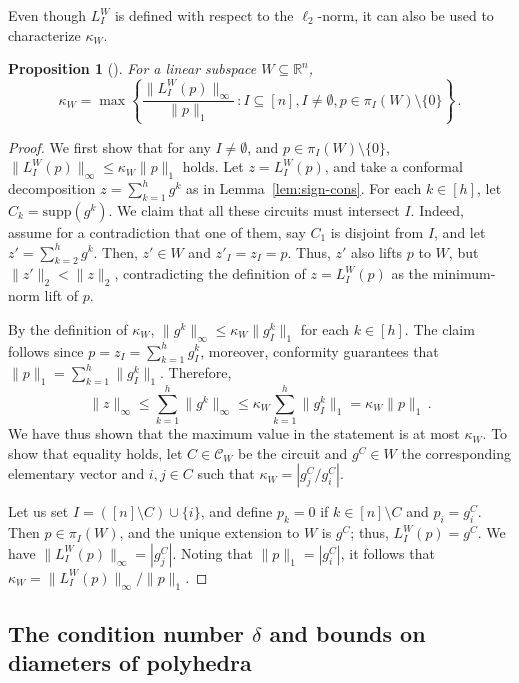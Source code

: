 \documentclass[11pt, a4paper]{article}
\newcommand{\circuits}{\mathcal{C}}
\newcommand{\supp}{\mathrm{supp}}
\newcommand{\1}{\mathbbm{1}}
\newtheorem{prop}[theorem]{Proposition}
\theoremstyle{case}
\newcommand{\R}{\mathbb{R}}
\begin{document}
Even though $L_I^W$ is defined with respect to the $\ell_2$-norm, it can also be used to characterize $\kappa_W$.
\begin{prop}[\cite{DadushNV20}]\label{lem:kappa-lift}
For a linear subspace $W  \subseteq \R^n$,
\[
\kappa_W =\max\left\{ \frac{\|L_I^W(p)\|_\infty}{\|p\|_1}\, : {I\subseteq [n]}, I\neq\emptyset, p\in \pi_I(W)\setminus\{0\}\right\}\, .
\]
\end{prop}

\begin{proof}
We first show that for any $I\neq\emptyset$, and $p\in \pi_I(W)\setminus\{0\}$, $\|L_I^W(p)\|_\infty\le \kappa_W \|p\|_1$ holds. 
Let $z=L_I^W(p)$, and take a conformal decomposition $z=\sum_{k=1}^h g^k$ as in Lemma~\ref{lem:sign-cons}. For each $k\in [h]$, let $C_k=\supp(g^k)$. We claim that all these circuits must intersect $I$. Indeed, assume for a contradiction that one of them, say $C_1$ is disjoint from $I$, and let $z'=\sum_{k=2}^h g^k$. Then, $z'\in W$ and $z'_I=z_I=p$. Thus, $z'$ also lifts $p$ to $W$, but $\|z'\|_2<\|z\|_2$, contradicting the definition of $z=L_I^W(p)$ as the minimum-norm lift of $p$.

By the definition of $\kappa_W$, $\|g^k\|_\infty\le \kappa_W \|g^k_I\|_1$ for each $k\in [h]$. The claim follows since $p=z_I=\sum_{k=1}^h g^k_I$, moreover, conformity guarantees that $\|p\|_1=\sum_{k=1}^h \|g^k_I\|_1$. Therefore,
\[
\|z\|_\infty\le \sum_{k=1}^h \|g^k\|_\infty\le \kappa_W \sum_{k=1}^h \|g^k_I\|_1=\kappa_W\|p\|_1\, .\]
We have thus shown that the maximum value in the statement is at most $\kappa_W$. To show that equality holds, let $C\in\circuits_W$ be the circuit and $g^C\in W$ the corresponding elementary vector and $i,j\in C$ such that $\kappa_W=|g^C_j/g^C_i|$.

Let us set $I=([n]\setminus C)\cup \{i\}$, and define $p_k=0$ if $k\in [n]\setminus C$ and $p_i=g^C_i$. Then  $p\in \pi_I(W)$,  and the unique extension to $W$ is $g^C$; thus, $L_I^W(p)=g^C$. We have $\|L_I^W(p)\|_\infty=|g^C_j|$. Noting that $\|p\|_1=|g^C_i|$, it follows that 
$\kappa_W=\|L_I^W(p)\|_\infty/\|p\|_1$.
\end{proof}

\subsection{The condition number $\delta$ and bounds on diameters of polyhedra}\label{sec:delta}
\end{document}
